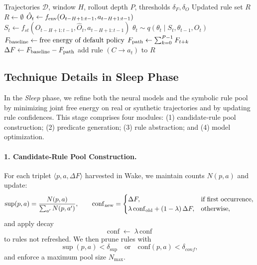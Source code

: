 \documentclass{article} %
\begin{document}
\begin{algorithm}[htbp]
\caption{Wake Phase: Posterior Update \& Rule Extraction}
\label{alg:wake-phase}
\begin{algorithmic}[1]
\Require Trajectories $\mathcal D$, window $H$, rollout depth $P$, thresholds $\delta_F,\delta_O$
\Ensure Updated rule set $R$
\State $R\leftarrow\emptyset$
    \State $\hat O_t\gets f_{\rm env}(O_{t-H+1:t-1},a_{t-H+1:t-1})$
    \State $S_t\gets f_{st}(O_{t-H+1:t-1},\hat O_t,a_{t-H+1:t-1})$
    \State $\theta_t\sim q(\theta_t\mid S_t,\theta_{t-1},O_t)$
    \State $F_{\rm baseline}\gets\text{free energy of default policy}$
      \State $F_{\rm path}\gets\sum_{k=0}^{P-1}F_{t+k}$
      \State $\Delta F\gets F_{\rm baseline}-F_{\rm path}$
        \State add rule $(C\to a_t)$ to $R$
      \EndIf
    \EndFor
  \EndFor
\EndFor
\end{algorithmic}
\end{algorithm}


\subsection{Technique Details in Sleep Phase}
\label{sec:Sleep}

In the \emph{Sleep} phase, we refine both the neural models and the symbolic rule pool by minimizing joint free energy on real or synthetic trajectories and by updating rule confidences.  This stage comprises four modules: (1) candidate‐rule pool construction; (2) predicate generation; (3) rule abstraction; and (4) model optimization.

\paragraph{1. Candidate‐Rule Pool Construction.}  
For each triplet \(\langle p,a,\Delta F\rangle\) harvested in Wake, we maintain counts \(N(p,a)\) and update:
\[
\sup(p,a)=\frac{N(p,a)}{\sum_{a'}N(p,a')},\qquad
\mathrm{conf}_{\rm new}=
\begin{cases}
\Delta F, & \text{if first occurrence},\\
\lambda\,\mathrm{conf}_{\rm old}+(1-\lambda)\,\Delta F, & \text{otherwise},
\end{cases}
\]
and apply decay 
\[
  \mathrm{conf}\;\leftarrow\;\lambda\,\mathrm{conf}
\]
to rules not refreshed.  We then prune rules with 
\[
  \sup(p,a)<\delta_{\sup}
  \quad\text{or}\quad
  \mathrm{conf}(p,a)<\delta_{conf},
\]
and enforce a maximum pool size \(N_{\max}\).
\end{document}
